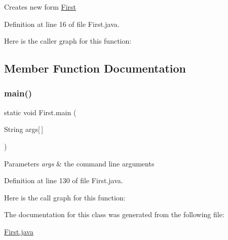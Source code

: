 Creates new form \mbox{\hyperlink{class_first}{First}} 

Definition at line 16 of file First.\+java.

Here is the caller graph for this function\+:


\subsection{Member Function Documentation}
\mbox{\label{class_first_a4fdb5976b7fdc07e45c9936e47d40789}} 
\subsubsection{\texorpdfstring{main()}{main()}}
{\footnotesize\ttfamily static void First.\+main (\begin{DoxyParamCaption}\item[{String}]{args\mbox{[}$\,$\mbox{]} }\end{DoxyParamCaption})\hspace{0.3cm}{\ttfamily [static]}}


\begin{DoxyParams}{Parameters}
{\em args} & the command line arguments \\
\hline
\end{DoxyParams}


Definition at line 130 of file First.\+java.

Here is the call graph for this function\+:


The documentation for this class was generated from the following file\+:\begin{DoxyCompactItemize}
\item 
\mbox{\hyperlink{_first_8java}{First.\+java}}\end{DoxyCompactItemize}
